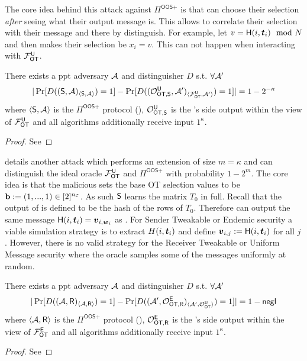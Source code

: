 The core idea behind this attack against $\Pi^{\textsf{OOS+}}$ is that \rec can choose their selection \emph{after} seeing what their output message is. This allows \rec to correlate their selection with their message and there by distinguish. For example, let $v=\H(i,\tt_i)\mod N$ and then \rec makes their selection be $x_i=v$. This can not happen when interacting with $\OOT^\U$.

\begin{lemma} \label{lem:malRec2}
	There exists a ppt adversary $\Adv$ and distinguisher $D$ s.t.  $\forall\Adv'$ 
	$$
	|\Pr[D((\send, \Adv)_{\langle\send, \Adv\rangle})=1]-\Pr[D((\O^{\U}_{\textsf{OT,\send}}, \Adv')_{\langle\OOT^\U, \Adv'\rangle})=1]|=1-2^{-\kappa}
	$$
	where $\langle\send, \Adv\rangle$ is the $\Pi^{\textsf{OOS+}}$ protocol (), $\O^{\U}_{\textsf{OT,\send}}$ is the \send's side output within the view of $\OOT^{\U}$ and all algorithms additionally receive input $1^\kappa$. 
\end{lemma}
\iffullversion

\else
\begin{proof}
	See 
\end{proof}
\fi




 details another attack which performs an extension of size $m=\kappa$ and can distinguish the ideal oracle $\OOT^\U$ and $\Pi^{\textsf{OOS+}}$ with probability $1-2^m$. The core idea is that the malicious \send sets the base OT selection values to be $\mathbf{b}:=(1,...,1)\in [2]^\nc$. As such $\send$ learns the matrix $T_0$ in full. Recall that the output of \rec is defined to be the hash of the rows of $T_0$. Therefore \send can output the same message $\H(i, \tt_i)=\vv_{i,\ww_i}$ as \rec. For Sender Tweakable or Endemic security a viable simulation strategy is to extract $H(i, \tt_i)$ and define $\vv_{i,j}:=\H(i, \tt_i)$ for all $j$. However, there is no valid strategy for the Receiver Tweakable or Uniform Message security where the oracle samples some of the messages uniformly at random.

\begin{lemma} \label{lem:malSend}
	There exists a ppt adversary $\Adv$ and distinguisher $D$ s.t. $\forall\Adv'$ 
	$$
		|\Pr[D((\Adv, \rec)_{\langle\Adv,\rec\rangle})=1]-\Pr[D((\Adv', \O^{\E}_{\textsf{OT,\rec}})_{\langle\Adv',\O^{\U}_{\textsf{OT}}\rangle})=1]|=1-\negl
	$$
	where $\langle\Adv,\rec\rangle$ is the $\Pi^{\textsf{OOS+}}$ protocol (), $\O^{\E}_{\textsf{OT,\rec}}$ is the \rec's side output within the view of $\OOT^{\E}$ and all algorithms additionally receive input $1^\kappa$. 
\end{lemma}
\iffullversion

\else
\begin{proof}
	See 
\end{proof}
\fi





